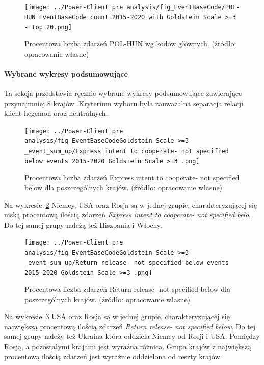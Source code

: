 \documentclass[11pt]{report}
\begin{document}
    \begin{figure}[!htp]
        \centering
        \texttt{[image: ../Power-Client pre analysis/fig\_EventBaseCode/POL-HUN EventBaseCode count 2015-2020 with Goldstein Scale >=3 - top 20.png]}
        \caption{Procentowa liczba zdarzeń POL-HUN wg kodów głównych. (źródło: opracowanie własne)}
        \label{fig:Power-Client:EBC:Goldstein:POL-HUN}
    \end{figure}

    \paragraph{Wybrane wykresy podsumowujące}
    Ta sekcja przedstawia ręcznie wybrane wykresy podsumowujące zawierające przynajmniej 8 krajów.
    Kryterium wyboru była zauważalna separacja relacji klient-hegemon oraz neutralnych.

    \begin{figure}[!htp]
        \centering
        \texttt{[image: ../Power-Client pre analysis/fig\_EventBaseCodeGoldstein Scale >=3 \_event\_sum\_up/Express intent to cooperate- not specified below events 2015-2020 Goldstein Scale >=3 .png]}
        \caption{Procentowa liczba zdarzeń Express intent to cooperate- not specified below dla poszczególnych krajów. (źródło: opracowanie własne)}
        \label{fig:Power-Client:ERC:Goldstein:SumUp:Express intent to cooperate- not specified below}
    \end{figure}
    Na wykresie~\ref{fig:Power-Client:ERC:Goldstein:SumUp:Express intent to cooperate- not specified below} Niemcy, USA oraz Rosja są w jednej grupie,
    charakteryzującej się niską procentową ilością zdarzeń \textit{Express intent to cooperate- not specified belo}.
    Do tej samej grupy należą też Hiszpania i Włochy.

    \begin{figure}[!htp]
        \centering
        \texttt{[image: ../Power-Client pre analysis/fig\_EventBaseCodeGoldstein Scale >=3 \_event\_sum\_up/Return release- not specified below events 2015-2020 Goldstein Scale >=3 .png]}
        \caption{Procentowa liczba zdarzeń Return release- not specified below dla poszczególnych krajów. (źródło: opracowanie własne)}
        \label{fig:Power-Client:ERC:Goldstein:SumUp:Return release- not specified below}
    \end{figure}
    Na wykresie~\ref{fig:Power-Client:ERC:Goldstein:SumUp:Return release- not specified below} USA oraz Rosja są w jednej grupie,
    charakteryzującej się największą procentową ilością zdarzeń \textit{Return release- not specified below}.
    Do tej samej grupy należy też Ukraina która oddziela Niemcy od Rosji i USA\@.
    Pomiędzy Rosją, a pozostałymi krajami jest wyraźna różnica.
    Grupa krajów z największą procentową ilością zdarzeń jest wyraźnie oddzielona od reszty krajów.
\end{document}
